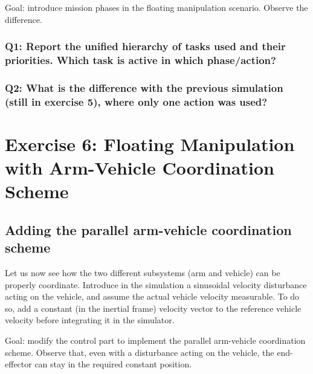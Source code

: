 \documentclass{article}
\begin{document}
Goal: introduce mission phases in the floating manipulation scenario. Observe the difference.

\subsubsection{Q1: Report the unified hierarchy of tasks used and their priorities. Which task is active in which phase/action?}

\subsubsection{Q2: What is the difference with the previous simulation (still in exercise 5), where only one action was used?}

\clearpage
\section{Exercise 6: Floating Manipulation with Arm-Vehicle Coordination Scheme}
\subsection{Adding the parallel arm-vehicle coordination scheme}
Let us now see how the two different subsystems (arm and vehicle) can be properly coordinate. Introduce in the simulation a sinusoidal velocity disturbance acting on the vehicle, and assume the actual vehicle velocity measurable. To do so, add a constant (in the inertial frame) velocity vector to the reference vehicle velocity before integrating it in the simulator.

Goal: modify the control part to implement the parallel arm-vehicle coordination scheme. Observe that, even with a disturbance acting on the vehicle, the end-effector can stay in the required constant position.
\end{document}
